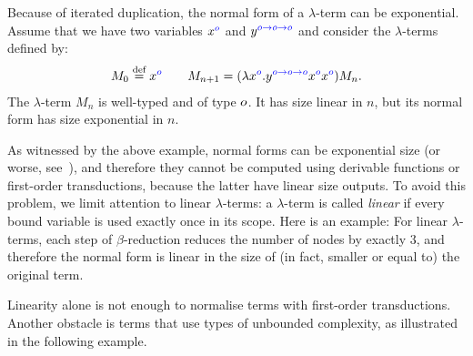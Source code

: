 \begin{example}\label{ex:exponential}
    Because of iterated duplication, the normal form of a $\lambda$-term can be exponential. Assume that we have two variables ${x}^{\color{blue}{o}}$ and ${y}^{\color{blue}{o\to o\to o}}$ and consider the $\lambda$-terms defined by:
    \begin{align*}
        M_0 \stackrel{\text{def}}= {x}^{\color{blue}{o}} \qquad M_{n+1} = (\lambda {x}^{\color{blue}{o}} . {y}^{\color{blue}{o\to o\to o}}  {x}^{\color{blue}{o}} {x}^{\color{blue}{o}})M_n.
    \end{align*}
    The $\lambda$-term $M_n$ is well-typed and of type $o$. It has size linear in $n$, but its normal form has size exponential in $n$. 
\end{example}
As witnessed by the above example, normal forms can be exponential size (or worse, see~\cite[Section 3.6]{sorensen_lectures_2006}), and therefore they cannot be computed  using derivable functions or first-order transductions, because the latter have linear size outputs. To avoid this problem, we  limit attention to linear $\lambda$-terms: a $\lambda$-term is called \emph{linear} if every bound variable is used exactly once in its scope. Here is an example: 
For linear $\lambda$-terms, each step of $\beta$-reduction reduces the number of nodes by exactly 3, and therefore the normal form is linear in the size of (in fact, smaller or equal to) the original term. 

Linearity alone is not enough to normalise terms with first-order transductions. Another obstacle is terms that use types of unbounded complexity, as illustrated in the following example. 

